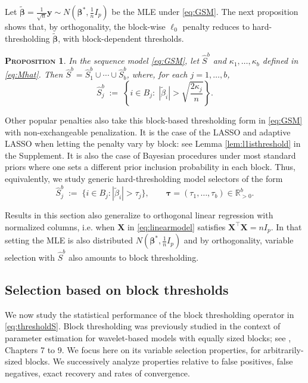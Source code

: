 \documentclass[aos]{imsart}
\theoremstyle{plain}
\newtheorem{prop}[thm]{\textsc{Proposition}}
\newcommand{\R}{\mathbb{R}}
\newcommand{\bs}{\boldsymbol}
\begin{document}
Let $\tilde{\bs \beta}=\frac{1}{\sqrt{n}}\bs y \sim N(\bs \beta^*,\tfrac{1}{n}I_p)$ be the MLE under \eqref{eq:GSM}. The next proposition shows that, by orthogonality, the block-wise $\ell_0$ penalty reduces to hard-thresholding $\tilde{\bs \beta}$, with block-dependent thresholds.
\begin{prop}\label{prop:isthresh}
	In the sequence model \eqref{eq:GSM}, let $\hat{S}^b$ and $\kappa_1,\ldots,\kappa_b$ defined in \eqref{eq:Mhat}. Then $\hat S^b=\hat S^b_1\cup \cdots \cup \hat S^b_b$, where, for each $j=1,\ldots,b$,
	$$
	\hat S_j^b\;:=\;\left\{i\in B_j:\; |\tilde{\beta}_i|> \sqrt{\frac{2\kappa_j}{n}}\right\}.
	$$ 
\end{prop}
Other popular penalties
also take this block-based thresholding form in \eqref{eq:GSM} with non-exchangeable penalization. It is the case of the LASSO and adaptive LASSO when letting the penalty vary by block: see Lemma \ref{lem:l1isthreshold} %
in the Supplement. It is also the case of Bayesian procedures under most standard priors \citep{davidomiros} where one sets a different prior inclusion probability in each block. Thus, equivalently, we study generic hard-thresholding model selectors of the form
\begin{equation}\label{eq:thresholdS}
\hat S_j^{b}\;:=\;\{i\in B_j: |\tilde{\beta}_i|>\tau_j\}, \qquad\bs \tau=(\tau_1,\ldots,\tau_b)\in \R^b_{>0}.	
\end{equation}

Results in this section also generalize to orthogonal linear regression with normalized columns, i.e. when $\bs X$ in \eqref{eq:linearmodel} satisfies $\bs X^\top \bs X=n I_p$. In that setting the MLE is also distributed $N(\bs \beta^*,\tfrac{1}{n}I_p)$ and by orthogonality, variable selection with $\hat{S}^b$ also amounts to block thresholding.

\subsection{Selection based on block thresholds}
\label{ssec:block_thresholds}


We now study the statistical performance of the block thresholding operator in \eqref{eq:thresholdS}. Block thresholding was previously studied in the context of parameter estimation for wavelet-based models with equally sized blocks; see \cite{johnstone}, Chapters 7 to 9.
We focus here on its variable selection properties, for arbitrarily-sized blocks. We successively analyze properties relative to false positives, false negatives, exact recovery and rates of convergence. 
\medskip
\end{document}
